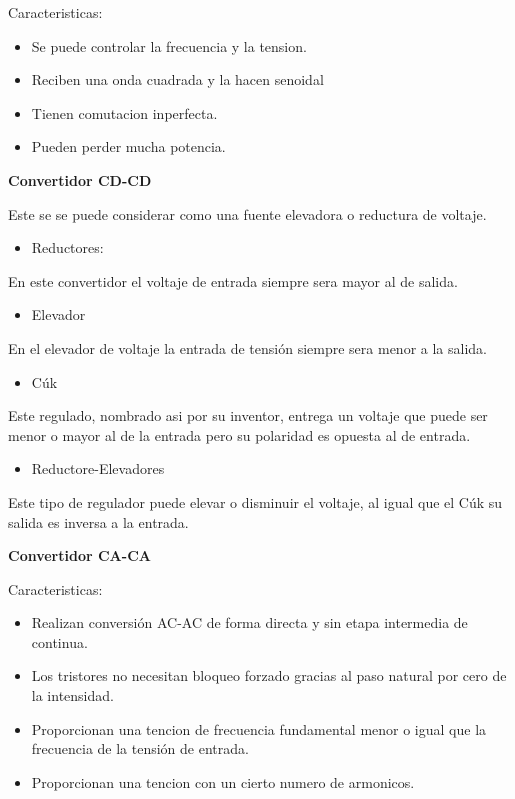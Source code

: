 \documentclass[spanish]{article}
\begin{document}
Caracteristicas:
\begin{itemize}
\item Se puede controlar la frecuencia y la tension.
\item Reciben una onda cuadrada y la hacen senoidal
\item Tienen comutacion inperfecta.
\item Pueden perder mucha potencia.
\end{itemize}
\begin{center}
\textbf{\LARGE{}Convertidor CD-CD}{\LARGE\par}
\par\end{center}

Este se se puede considerar como una fuente elevadora o reductura
de voltaje.\\

\begin{itemize}
\item Reductores:
\end{itemize}
En este convertidor el voltaje de entrada siempre sera mayor al de
salida.
\begin{itemize}
\item Elevador
\end{itemize}
En el elevador de voltaje la entrada de tensi\'on siempre sera menor
a la salida.
\begin{itemize}
\item C\'uk
\end{itemize}
Este regulado, nombrado asi por su inventor, entrega un voltaje que
puede ser menor o mayor al de la entrada pero su polaridad es opuesta
al de entrada.
\begin{itemize}
\item Reductore-Elevadores
\end{itemize}
Este tipo de regulador puede elevar o disminuir el voltaje, al igual
que el C\'uk su salida es inversa a la entrada.\\

\begin{center}
\textbf{\LARGE{}Convertidor CA-CA}{\LARGE\par}
\par\end{center}

Caracteristicas:
\begin{itemize}
\item Realizan conversi\'on AC-AC de forma directa y sin etapa intermedia
de continua.
\item Los tristores no necesitan bloqueo forzado gracias al paso natural
por cero de la intensidad.
\item Proporcionan una tencion de frecuencia fundamental menor o igual que
la frecuencia de la tensi\'on de entrada.
\item Proporcionan una tencion con un cierto numero de armonicos.
\end{itemize}
\pagebreak{}
\begin{thebibliography}{siam}


\end{thebibliography}
\end{document}
